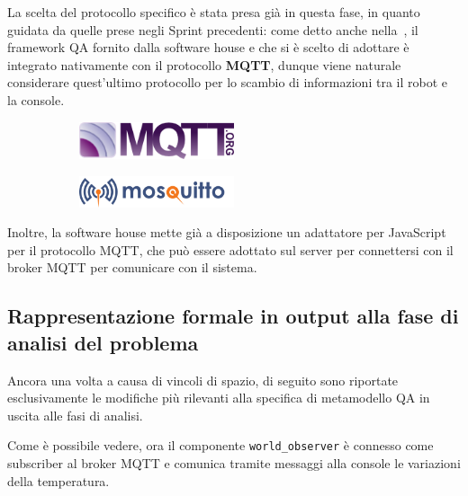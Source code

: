 La scelta del protocollo specifico è stata presa già in questa fase, in quanto guidata da quelle prese negli Sprint precedenti:
come detto anche nella~, il framework QA fornito dalla software house e che si è scelto di adottare è integrato nativamente con il protocollo \textbf{MQTT},
dunque viene naturale considerare quest'ultimo protocollo per lo scambio di informazioni tra il robot e la console.

\begin{figure}
  \centering
  \begin{subfigure}[b]{0.45\textwidth}
    \centering
    \includegraphics[width=0.5\textwidth]{res/mqttorg.png}%
    \label{subfig:sp3:mqtt}
  \end{subfigure}
  \hfill
  \begin{subfigure}[b]{0.45\textwidth}
    \centering
    \includegraphics[width=0.5\textwidth]{res/mosquitto.png}%
    \label{subfig:sp3:mosquitto}
  \end{subfigure}%
  \label{fig:sp3:mqtt}
\end{figure}

Inoltre, la software house mette già a disposizione un adattatore per JavaScript per il protocollo MQTT, che può essere adottato sul server per connettersi con il broker MQTT per comunicare con il sistema.

\subsection[Rappresentazione formale]{Rappresentazione formale in output alla fase di analisi del problema}

Ancora una volta a causa di vincoli di spazio, di seguito sono riportate esclusivamente le modifiche più rilevanti alla specifica di metamodello QA in uscita alle fasi di analisi.

% 


Come è possibile vedere, ora il componente \texttt{world\_observer} è connesso come subscriber al broker MQTT e comunica tramite messaggi alla console le variazioni della temperatura.

